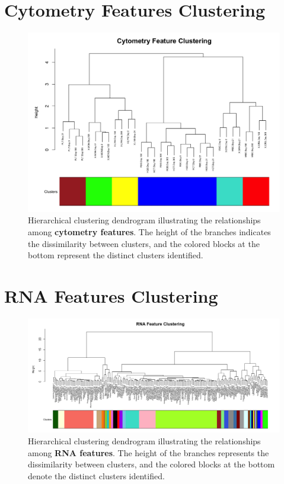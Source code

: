 \documentclass[12pt,a4paper]{report}
\begin{document}
\section{Cytometry Features Clustering}
\label{appendix:cytometry_features_clusterings}
\begin{figure}[H]
    \centering
    \includegraphics[width=\linewidth]{images/Cytometry_features_clustering_cut_colors.png}
    \caption[Cytometry features clustering dendrogram]{Hierarchical clustering dendrogram illustrating the relationships among \textbf{cytometry features}. The height of the branches indicates the dissimilarity between clusters, and the colored blocks at the bottom represent the distinct clusters identified.}
    \label{fig:Cytometry_features_clustering_cut_colors}
\end{figure}

\section{RNA Features Clustering}
\label{appendix:rna_features_clusterings}
\begin{figure}[h!]
    \centering
    \includegraphics[width=1.4\linewidth, angle=270]{images/RNA_features_clustering_cut_colors.png}
    \caption[RNA features clustering dendrogram]{Hierarchical clustering dendrogram illustrating the relationships among \textbf{RNA features}. The height of the branches represents the dissimilarity between clusters, and the colored blocks at the bottom denote the distinct clusters identified.}
    \label{fig:RNA_features_clustering_cut_colors}
\end{figure}
\end{document}
